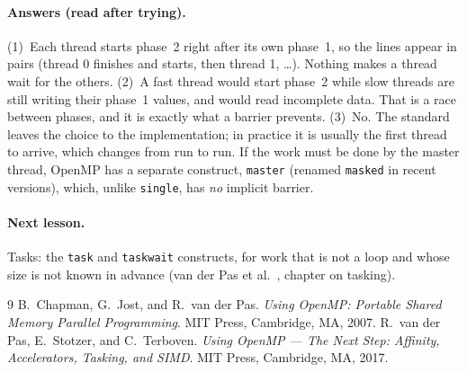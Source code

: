 \documentclass[11pt,a4paper]{article}
\begin{document}
\paragraph{Answers (read after trying).}
(1)~Each thread starts phase~2 right after its own phase~1, so the lines appear in pairs
(thread 0 finishes and starts, then thread 1, \ldots). Nothing makes a thread wait for
the others.
(2)~A fast thread would start phase~2 while slow threads are still writing their phase~1
values, and would read incomplete data. That is a race between phases, and it is exactly
what a barrier prevents.
(3)~No. The standard leaves the choice to the implementation; in practice it is usually
the first thread to arrive, which changes from run to run. If the work must be done by the master thread, OpenMP has a separate
construct, \texttt{master} (renamed \texttt{masked} in recent versions), which, unlike
\texttt{single}, has \emph{no} implicit barrier.

\paragraph{Next lesson.} Tasks: the \texttt{task} and \texttt{taskwait} constructs, for
work that is not a loop and whose size is not known in advance (van der Pas
et al.~\cite{vdp}, chapter on tasking).

\begin{thebibliography}{9}
 B.~Chapman, G.~Jost, and R.~van der Pas. \emph{Using OpenMP: Portable
  Shared Memory Parallel Programming}. MIT Press, Cambridge, MA, 2007.
 R.~van der Pas, E.~Stotzer, and C.~Terboven. \emph{Using OpenMP --- The Next
  Step: Affinity, Accelerators, Tasking, and SIMD}. MIT Press, Cambridge, MA, 2017.
\end{thebibliography}
\end{document}
